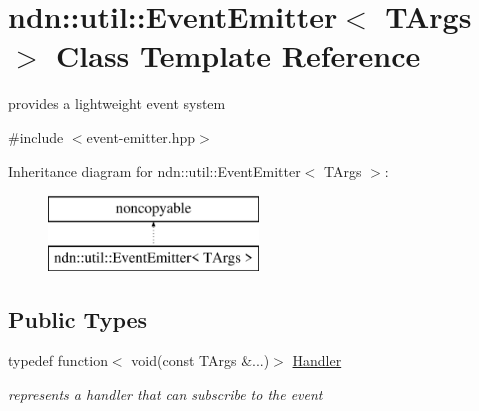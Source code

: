 \hypertarget{classndn_1_1util_1_1EventEmitter}{}\section{ndn\+:\+:util\+:\+:Event\+Emitter$<$ T\+Args $>$ Class Template Reference}
\label{classndn_1_1util_1_1EventEmitter}


provides a lightweight event system  




{\ttfamily \#include $<$event-\/emitter.\+hpp$>$}

Inheritance diagram for ndn\+:\+:util\+:\+:Event\+Emitter$<$ T\+Args $>$\+:\begin{figure}[H]
\begin{center}
\leavevmode
\includegraphics[height=2.000000cm]{classndn_1_1util_1_1EventEmitter}
\end{center}
\end{figure}
\subsection*{Public Types}
\begin{DoxyCompactItemize}
\item 
typedef function$<$ void(const T\+Args \&...)$>$ \hyperlink{classndn_1_1util_1_1EventEmitter_ad8d47433bcb8c1dbb94a4b6c92362423}{Handler}\hypertarget{classndn_1_1util_1_1EventEmitter_ad8d47433bcb8c1dbb94a4b6c92362423}{}\label{classndn_1_1util_1_1EventEmitter_ad8d47433bcb8c1dbb94a4b6c92362423}

\begin{DoxyCompactList}\small\item\em represents a handler that can subscribe to the event \end{DoxyCompactList}\end{DoxyCompactItemize}
